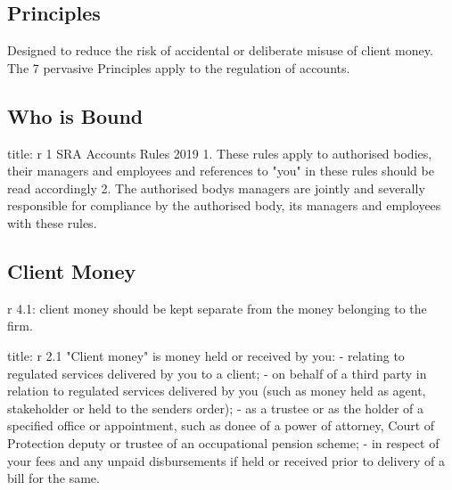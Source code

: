 \documentclass[
]{article}
\newenvironment{Shaded}{}{}
\newcommand{\NormalTok}[1]{#1}
\begin{document}
\hypertarget{principles}{%
\subsection{Principles}\label{principles}}

Designed to reduce the risk of accidental or deliberate misuse of client
money. The 7 pervasive Principles apply to the regulation of accounts.

\hypertarget{who-is-bound}{%
\subsection{Who is Bound}\label{who-is-bound}}

\begin{Shaded}
\begin{Highlighting}[]
\NormalTok{title: r 1 SRA Accounts Rules 2019}
\NormalTok{1. These rules apply to authorised bodies, their managers and employees and references to "you" in these rules should be read accordingly}
\NormalTok{2. The authorised body\textquotesingle{}s managers are jointly and severally responsible for compliance by the authorised body, its managers and employees with these rules.}
\end{Highlighting}
\end{Shaded}

\hypertarget{client-money}{%
\subsection{Client Money}\label{client-money}}

r 4.1: client money should be kept separate from the money belonging to
the firm.

\begin{Shaded}
\begin{Highlighting}[]
\NormalTok{title: r 2.1}
\NormalTok{"Client money" is money held or received by you:}
\NormalTok{{-} relating to regulated services delivered by you to a client;}
\NormalTok{{-} on behalf of a third party in relation to regulated services delivered by you (such as money held as agent, stakeholder or held to the sender\textquotesingle{}s order);}
\NormalTok{{-} as a trustee or as the holder of a specified office or appointment, such as donee of a power of attorney, Court of Protection deputy or trustee of an occupational pension scheme;}
\NormalTok{{-} in respect of your fees and any unpaid disbursements if held or received prior to delivery of a bill for the same.}
\end{Highlighting}
\end{Shaded}
\end{document}
